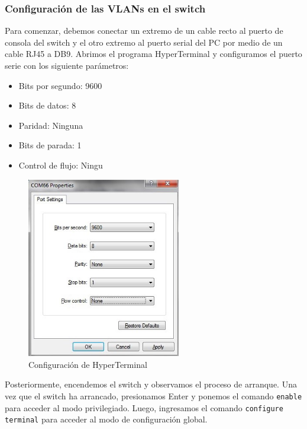     \subsubsection*{Configuración de las VLANs en el switch}

    Para comenzar, debemos conectar un extremo de un cable recto al puerto de consola del switch y el otro extremo al puerto serial del PC por medio de un cable RJ45 a DB9. Abrimos el programa HyperTerminal y configuramos el puerto serie con los siguiente parámetros:

    \begin{itemize}
        \item Bits por segundo: 9600
        \item Bits de datos: 8
        \item Paridad: Ninguna
        \item Bits de parada: 1
        \item Control de flujo: Ningu
    \end{itemize}

    \begin{figure}[H]
        \centering
        \includegraphics[width=0.6\textwidth]{img/HyperTerminal.jpg}
        \caption{Configuración de HyperTerminal}
        \label{fig:HyperTerminal}
    \end{figure}

    Posteriormente, encendemos el switch y observamos el proceso de arranque. Una vez que el switch ha arrancado, presionamos Enter y ponemos el comando \texttt{enable} para acceder al modo privilegiado. Luego, ingresamos el comando \texttt{configure terminal} para acceder al modo de configuración global.

